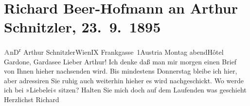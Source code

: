 

         
         \newcommand{\erwaehntePersonen}{Personen: }
         \newcommand{\erwaehnteInstitutionen}{}
         \newcommand{\erwaehnteOrte}{Orte: Frankgasse, Gardone Riviera, Grand Hotel Gardone, IX., Alsergrund, Wien, Österreich}
         \newcommand{\erwaehnteWerke}{Werke: Liebelei. Schauspiel in drei Akten}
               \section[Richard Beer-Hofmann an Arthur Schnitzler, 23. 9. 1895]{ Richard Beer-Hofmann an Arthur Schnitzler,
               23. 9. 1895}\nopagebreak{}\rehead{ }\begin{ledgroupsized}[t]{13cm}\normalsize\beginnumbering \toendnotes[C]{\smallbreak\pagebreak[2]} 
\pstart{}{\pb}\textcolor{gray}{\textbf{A}}n\pend{}\pstart{}D\textsuperscript{r} Arthur Schnitzler\pend{}\pstart{}Wien\pend{}\pstart{}IX Frankgasse 1\pend{}\pstart{}Austria\pend{}{\bigskip}\pstart
           \raggedleft{}{\pb}\introOben{}Montag{ }abend\introOben{}{ }Hôtel Gardone, Gardasee\pend
           \pstart
           Lieber Arthur! Ich denke daß man mir morgen einen Brief von Ihnen
               hieher nachsenden wird. Bis mindestens Donnerstag bleibe ich hier, aber
               adressiren Sie ruhig auch weiterhin hieher es wird nachgeschickt. Wo werde ich bei
                  »Liebelei« sitzen? Halten Sie mich doch auf dem
               Laufenden was geschieht\pend
           \pstart Herzlichst \spacefill\mbox{Richard}\pend{}
         
         \endnumbering{}\end{ledgroupsized}  \newcommand{\dateiname}{L00491}\newcommand{\titel}{Richard Beer-Hofmann an Arthur Schnitzler, 23. 9. 1895}\newcommand{\editorInnen}{Martin Anton Müller und Gerd-Hermann Susen}
      